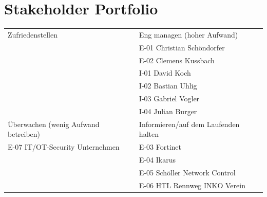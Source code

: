 \documentclass[
	headings=optiontotocandhead,%
	oneside,
	numbers=noenddot,%
	toc=flat, %
	10pt, %
	parskip=full, %
	listof=totoc, %
	listof=flat, %
	numbers=noenddot, %
	bibliography=totoc, %
	a4paper,DIV=14,
]{scrartcl}
\newcommand{\green}[1]{\textcolor[HTML]{00B050}{#1}}
\newcommand{\red}[1]{\textcolor[HTML]{FF0000}{#1}}
\begin{document}
\section{Stakeholder Portfolio}
\begin{table}[h]
\begin{tabularx} {\textwidth} {|X|X|}
\hline

\footnotesize{\textcolor[HTML]{A6A6A6}{Zufriedenstellen}}
& \footnotesize{\textcolor[HTML]{A6A6A6}{Eng managen (hoher Aufwand)}} \\ 
& \green {E-01 Christian Schöndorfer} \\
& \green {E-02 Clemens Kussbach} \\
& \green {I-01 David Koch} \\
& \green {I-02 Bastian Uhlig} \\
& \green {I-03 Gabriel Vogler} \\
& \green {I-04 Julian Burger}
 \\ \hline 

\footnotesize{\textcolor[HTML]{A6A6A6}{Überwachen (wenig Aufwand betreiben)}}
& \footnotesize{\textcolor[HTML]{A6A6A6}{Informieren/auf dem Laufenden halten}} \\
\red {E-07 IT/OT-Security Unternehmen} 
& \green {E-03 Fortinet} \\
& \green {E-04 Ikarus} \\
& \green {E-05 Schöller Network Control} \\
& \green {E-06 HTL Rennweg INKO Verein}

 
 \\ \hline 



\end{tabularx}
\end{table}
\end{document}
